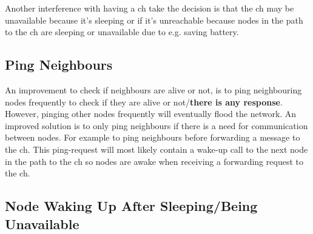 \documentclass[USenglish]{uit-thesis}
\begin{document}
Another interference with having a \gls{ch} take the decision is that the \gls{ch} may be unavailable because it's sleeping or if it's unreachable because nodes in the path to the \gls{ch} are sleeping or unavailable due to e.g. saving battery. 

\subsection{Ping Neighbours}
An improvement to check if neighbours are alive or not, is to ping neighbouring nodes frequently to check if they are alive or not/\textbf{there is any response}. However, pinging other nodes frequently will eventually flood the network. An improved solution is to only ping neighbours if there is a need for communication between nodes. For example to ping neighbours before forwarding a message to the \gls{ch}. This ping-request will most likely contain a wake-up call to the next node in the path to the \gls{ch} so nodes are awake when receiving a forwarding request to the \gls{ch}.



\subsection{Node Waking Up After Sleeping/Being Unavailable}



\end{document}
